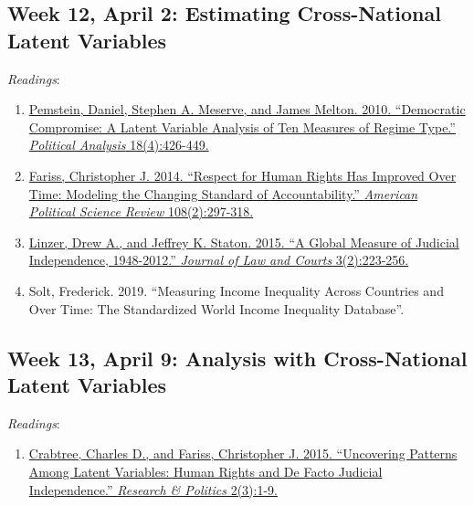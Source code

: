 \documentclass[]{article}
\providecommand{\tightlist}{%
  \setlength{\itemsep}{0pt}\setlength{\parskip}{0pt}}
\begin{document}
\hypertarget{week-12-april-2-estimating-cross-national-latent-variables}{%
\subsection{Week 12, April 2: Estimating Cross-National Latent
Variables}\label{week-12-april-2-estimating-cross-national-latent-variables}}

\emph{Readings}:

\begin{enumerate}
\def\labelenumi{\arabic{enumi}.}
\tightlist
\item
  \href{http://pan.oxfordjournals.org.proxy.lib.uiowa.edu/content/18/4/426}{Pemstein,
  Daniel, Stephen A. Meserve, and James Melton. 2010. ``Democratic
  Compromise: A Latent Variable Analysis of Ten Measures of Regime
  Type.'' \emph{Political Analysis} 18(4):426-449.}
\item
  \href{http://dx.doi.org.proxy.lib.uiowa.edu/10.1017/S0003055414000070}{Fariss,
  Christopher J. 2014. ``Respect for Human Rights Has Improved Over
  Time: Modeling the Changing Standard of Accountability.''
  \emph{American Political Science Review} 108(2):297-318.}
\item
  \href{http://www.journals.uchicago.edu.proxy.lib.uiowa.edu/doi/10.1086/682150}{Linzer,
  Drew A., and Jeffrey K. Staton. 2015. ``A Global Measure of Judicial
  Independence, 1948-2012.'' \emph{Journal of Law and Courts}
  3(2):223-256.}
\item
  Solt, Frederick. 2019. ``Measuring Income Inequality Across Countries
  and Over Time: The Standardized World Income Inequality Database''.
\end{enumerate}

\pagebreak

\hypertarget{week-13-april-9-analysis-with-cross-national-latent-variables}{%
\subsection{Week 13, April 9: Analysis with Cross-National Latent
Variables}\label{week-13-april-9-analysis-with-cross-national-latent-variables}}

\emph{Readings}:

\begin{enumerate}
\def\labelenumi{\arabic{enumi}.}
\tightlist
\item
  \href{http://rap.sagepub.com/content/2/3/2053168015605343}{Crabtree,
  Charles D., and Fariss, Christopher J. 2015. ``Uncovering Patterns
  Among Latent Variables: Human Rights and De Facto Judicial
  Independence.'' \emph{Research \& Politics} 2(3):1-9.}
\end{enumerate}
\end{document}
